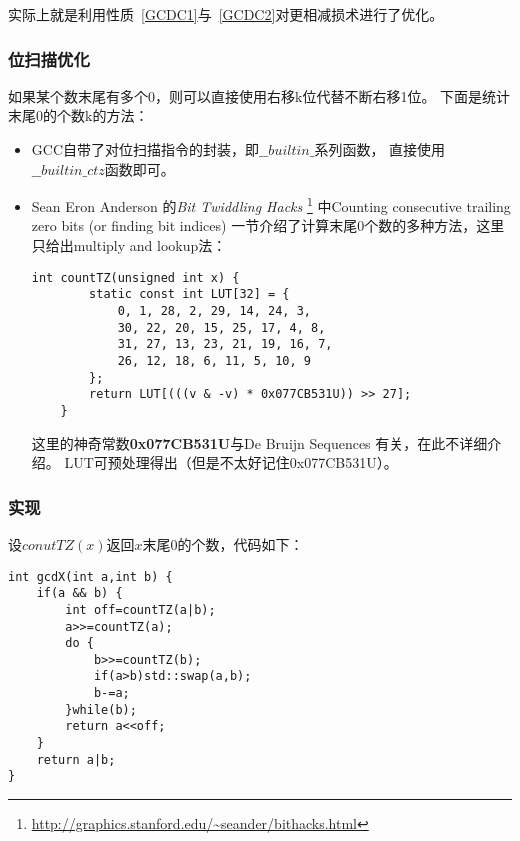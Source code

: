 实际上就是利用性质~\ref{GCDC1}与~\ref{GCDC2}对更相减损术进行了优化。

\subsubsection{位扫描优化}

如果某个数末尾有多个0，则可以直接使用右移k位代替不断右移1位。
下面是统计末尾0的个数k的方法：

\begin{itemize}
    \item GCC自带了对位扫描指令的封装，即$\_\_builtin\_$系列函数，
    直接使用$\_\_builtin\_ctz$函数即可。
    \item Sean Eron Anderson 的\emph{Bit Twiddling Hacks}
    \footnote{\url{http://graphics.stanford.edu/~seander/bithacks.html}}
    中Counting consecutive trailing zero bits (or finding bit indices)
    一节介绍了计算末尾0个数的多种方法，这里只给出multiply and lookup法：
    \begin{lstlisting}[title=countTZ]
    int countTZ(unsigned int x) {
        static const int LUT[32] = {
            0, 1, 28, 2, 29, 14, 24, 3,
            30, 22, 20, 15, 25, 17, 4, 8,
            31, 27, 13, 23, 21, 19, 16, 7,
            26, 12, 18, 6, 11, 5, 10, 9
        };
        return LUT[(((v & -v) * 0x077CB531U)) >> 27];
    }
    \end{lstlisting}
    这里的神奇常数{\bfseries 0x077CB531U}与De Bruijn Sequences
    有关，在此不详细介绍。
    LUT可预处理得出（但是不太好记住0x077CB531U）。
\end{itemize}

\subsubsection{实现}

设$conutTZ(x)$返回$x$末尾0的个数，代码如下：

\begin{lstlisting}[title=gcdX]
int gcdX(int a,int b) {
    if(a && b) {
        int off=countTZ(a|b);
        a>>=countTZ(a);
        do {
            b>>=countTZ(b);
            if(a>b)std::swap(a,b);
            b-=a;
        }while(b);
        return a<<off;
    }
    return a|b;
}
\end{lstlisting}
